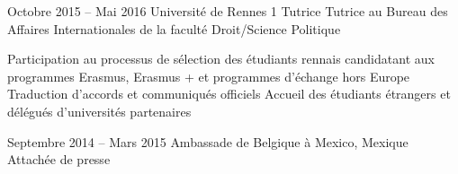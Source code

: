\documentclass[30pt, french]{tccv}
\begin{document}
\begin{upshape}
\begin{competence}
\fontsize{10pt}{1.1em}\color{text}\bodyfontlight\upshape\selectfont %






\end{competence}




%
%


\begin{experience}

\vspace{0.5cm}
\item{\color{text} Octobre 2015 -- Mai 2016}
     {Université de Rennes 1}
     {Tutrice}
     \fontsize{10pt}{1.1em}\color{text}\bodyfontlight\upshape\selectfont
{} Tutrice au Bureau des Affaires Internationales de la faculté Droit/Science Politique \\
\sloppy
{}%
    \setlength{\parskip}{-10pt}
    \begin{itemize}
      \cvitem[\checkmark] Participation au processus de sélection des étudiants rennais candidatant aux programmes Erasmus, Erasmus + et pro\-grammes d’échange hors Europe
      \cvitem[\checkmark] Traduction d’accords et communiqués officiels
      \cvitem[\checkmark] Accueil des étudiants étrangers et délégués d’uni\-ver\-sités par\-tenaires
    \end{itemize}     


\vspace{0.5cm}
\item{Septembre 2014 -- Mars 2015}
     {Ambassade de Belgique à Mexico, Mexique}
     {Attachée de presse}
     \fontsize{10pt}{1.1em}\color{text}\bodyfontlight\upshape\selectfont


\end{experience}
\end{upshape}
\end{document}

